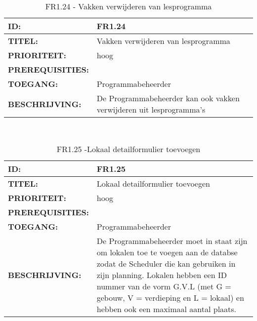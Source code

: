 \noindent\begin{table}[H]
            \begin{tabular}{l | p{10cm}}
                \textbf{ID:} & FR1.24 \\ \hline
                \textbf{TITEL:} & Vakken verwijderen van lesprogramma\\ \hline
                \textbf{PRIORITEIT:} &  hoog \\ \hline
                \textbf{PREREQUISITIES:} & \\ \hline
                \textbf{TOEGANG:} & Programmabeheerder \\ \hline
                \textbf{BESCHRIJVING:} & De Programmabeheerder kan ook vakken verwijderen uit lesprogramma’s \\ 
            \end{tabular}\\
            \caption{FR1.24 - Vakken verwijderen van lesprogramma}
            \label{tab:FR1.24 - Vakken verwijderen van lesprogramma}
        \end{table}

   
\noindent\begin{table}[H]
            \begin{tabular}{l | p{10cm}}
                \textbf{ID:} & FR1.25 \\ \hline
                \textbf{TITEL:} & Lokaal detailformulier toevoegen\\ \hline
                \textbf{PRIORITEIT:} &  hoog \\ \hline
                \textbf{PREREQUISITIES:} & \\ \hline
                \textbf{TOEGANG:} & Programmabeheerder \\ \hline
                \textbf{BESCHRIJVING:} & De Programmabeheerder moet in staat zijn om lokalen toe te voegen aan de databse zodat de Scheduler die kan gebruiken in zijn planning. Lokalen hebben een ID nummer van de vorm G.V.L (met G = gebouw, V = verdieping en L = lokaal) en hebben ook een maximaal aantal plaats.\\ 
            \end{tabular}\\
            \caption{FR1.25 -Lokaal detailformulier toevoegen}
            \label{tab:FR1.25 - Lokaal detailformulier toevoegen}
        \end{table}

